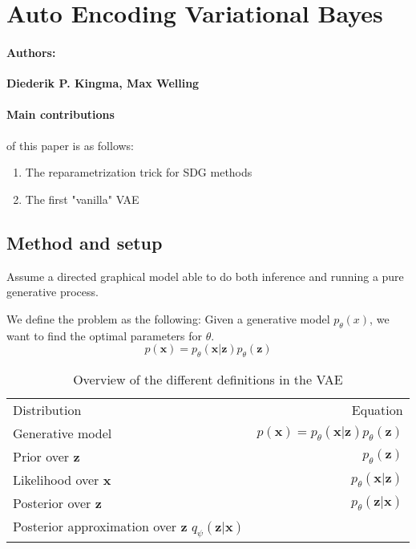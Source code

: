 \section{Auto Encoding Variational Bayes}
\paragraph{Authors:} \textbf{Diederik P. Kingma, Max Welling} \cite{kingma_auto-encoding_2014}

\paragraph{Main contributions} of this paper is as follows:
\begin{enumerate}
    \item The reparametrization trick for SDG methods
    \item The first "vanilla" VAE
\end{enumerate}

\subsection{Method and setup}

Assume a directed graphical model able to do both inference and running a pure generative process. 

We define the problem as the following: 
Given a generative model $p_\theta(x)$, we want to find the optimal parameters for $\theta$. 
\begin{equation}
    p(\mathbf{x}) = p_\theta(\mathbf{x}|\mathbf{z}) p_\theta(\mathbf{z})
    \label{eq:vae-generative}
\end{equation}



\begin{table}
    \caption{Overview of the different definitions in the VAE}
    \label{tab:}
    \centering
    \begin{tabular}{l|r}
        \hline
        Distribution & Equation  \\
        Generative model & 
        \(p(\mathbf{x}) = p_\theta(\mathbf{x}|\mathbf{z}) p_\theta(\mathbf{z})\)
        \\
        Prior over \(\mathbf{z}\) &
        \(p_\theta(\mathbf{z})\) 
        \\
        Likelihood over \(\mathbf{x}\) & 
        \( p_\theta(\mathbf{x}|\mathbf{z}) \)
        \\
        Posterior over \(\mathbf{z}\) & 
        \(p_\theta(\mathbf{z}|\mathbf{x})\)
        \\ 
        Posterior approximation over \(\mathbf{z}\) 
        \(q_\psi(\mathbf{z}|\mathbf{x})\)
    \end{tabular}
\end{table}

